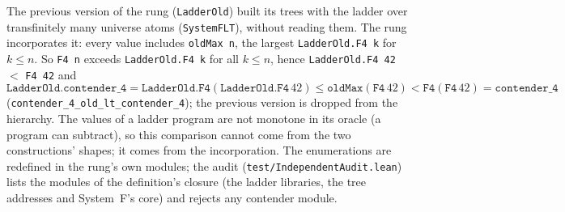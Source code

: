 \documentclass[11pt]{article}
\theoremstyle{definition}
\theoremstyle{remark}
\newcommand{\lean}[1]{\texttt{#1}}
\begin{document}
The previous version of the rung (\lean{LadderOld}) built its trees with the
ladder over transfinitely many universe atoms (\lean{SystemFLT}), without
reading them. The rung incorporates it: every value includes \lean{oldMax n},
the largest \lean{LadderOld.F4 k} for $k\le n$. So \lean{F4 n} exceeds
\lean{LadderOld.F4 k} for all $k\le n$, hence
\lean{LadderOld.F4 42} $<$ \lean{F4 42} and
\[
\mathtt{LadderOld.contender\_4}=\mathtt{LadderOld.F4}(\mathtt{LadderOld.F4}\,42)
\le\mathtt{oldMax}(\mathtt{F4}\,42)<\mathtt{F4}(\mathtt{F4}\,42)=\mathtt{contender\_4}
\]
(\lean{contender\_4\_old\_lt\_contender\_4}); the previous version is dropped
from the hierarchy. The values of a ladder program are not monotone in its
oracle (a program can subtract), so this comparison cannot come from the two
constructions' shapes; it comes from the incorporation. The
enumerations are redefined in the rung's own modules; the audit
(\lean{test/IndependentAudit.lean}) lists the modules of the definition's
closure (the ladder libraries, the tree addresses and System~F's core) and
rejects any contender module.
\end{document}
